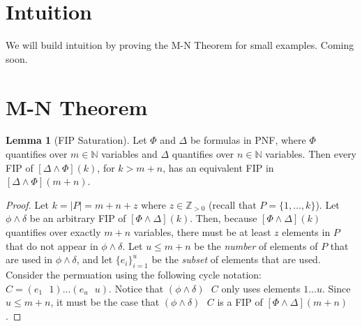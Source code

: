 \documentclass[12pt]{article}
\theoremstyle{definition}
\newtheorem{lemma}{Lemma}
\theoremstyle{remark}
\newcommand{\msp}{\text{ }}
\begin{document}
\section{Intuition}
We will build intuition by proving the M-N Theorem for small examples.  Coming soon.


\section{M-N Theorem}

\begin{lemma}[FIP Saturation]
  \label{lem:fip-sat}
  Let $\Phi$ and $\Delta$ be formulas in PNF, where $\Phi$ quantifies over $m \in \mathbb{N}$ variables and $\Delta$ quantifies over $n \in \mathbb{N}$ variables.  Then every FIP of $[\Delta \land \Phi](k)$, for $k > m+n$, has an equivalent FIP in $[\Delta \land \Phi](m+n)$.
\end{lemma}
\begin{proof}
  Let $k = |P| = m + n + z$ where $z \in \mathbb{Z}_{>0}$ (recall that $P = \{1,...,k\}$).  Let $\phi\land\delta$ be an arbitrary FIP of $[\Phi\land\Delta](k)$.  Then, because $[\Phi\land\Delta](k)$ quantifies over exactly $m+n$ variables, there must be at least $z$ elements in $P$ that do not appear in $\phi\land\delta$.  Let $u \leq m+n$ be the \textit{number} of elements of $P$ that are used in $\phi \land \delta$, and let $\{e_i\}_{i=1}^{u}$ be the \textit{subset} of elements that are used.  Consider the permuation using the following cycle notation: $C = (e_1 \msp 1)...(e_u \msp u)$.  Notice that $(\phi \land \delta) \msp C$ only uses elements $1 ... u$.  Since $u \leq m+n$, it must be the case that $(\phi \land \delta) \msp C$ is a FIP of $[\Phi \land \Delta](m+n)$.
\end{proof}
\end{document}
